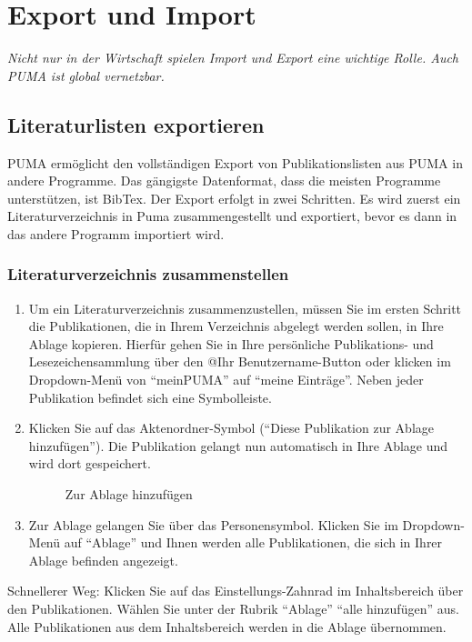 \chapter{Export und Import}
\label{ch:exportImport}
\textit{Nicht nur in der Wirtschaft spielen Import und Export eine wichtige Rolle. Auch PUMA ist global vernetzbar.}
\section{Literaturlisten exportieren}
\label{sec:llExportieren}
PUMA ermöglicht den vollständigen Export von Publikationslisten aus PUMA in andere Programme. Das gängigste Datenformat, dass die meisten Programme unterstützen, ist BibTex. \newline 
Der Export erfolgt in zwei Schritten. Es wird zuerst ein Literaturverzeichnis in Puma zusammengestellt und exportiert, bevor es dann in das andere Programm importiert wird.
\subsection{Literaturverzeichnis zusammenstellen}
\label{subsec:lvZusammenstellen}
\begin{enumerate}
    \item Um ein Literaturverzeichnis zusammenzustellen, müssen Sie im ersten Schritt die Publikationen, die in Ihrem Verzeichnis abgelegt werden sollen, in Ihre Ablage kopieren. Hierfür gehen Sie in Ihre persönliche Publikations- und Lesezeichensammlung über den @Ihr Benutzername-Button oder klicken im Dropdown-Menü von \enquote{meinPUMA} auf \enquote{meine Einträge}.  Neben jeder Publikation befindet sich eine Symbolleiste.
    \item Klicken Sie auf das Aktenordner-Symbol (\enquote{Diese Publikation zur Ablage hinzufügen}). Die Publikation gelangt nun automatisch in Ihre Ablage und wird dort gespeichert.
\begin{figure}[h!]
 \centering
 \caption{Zur Ablage hinzufügen}
 \label{fig:zurAblageHinzu}
\end{figure}
    \item Zur Ablage gelangen Sie über das Personensymbol. Klicken Sie im Dropdown-Menü auf \enquote{Ablage} und Ihnen werden alle Publikationen, die sich in Ihrer Ablage befinden angezeigt. 
\end{enumerate} 
Schnellerer Weg: Klicken Sie auf das Einstellungs-Zahnrad im Inhaltsbereich über den Publikationen. Wählen Sie unter der Rubrik \enquote{Ablage} \enquote{alle hinzufügen} aus. Alle Publikationen aus dem Inhaltsbereich werden in die Ablage übernommen. 
